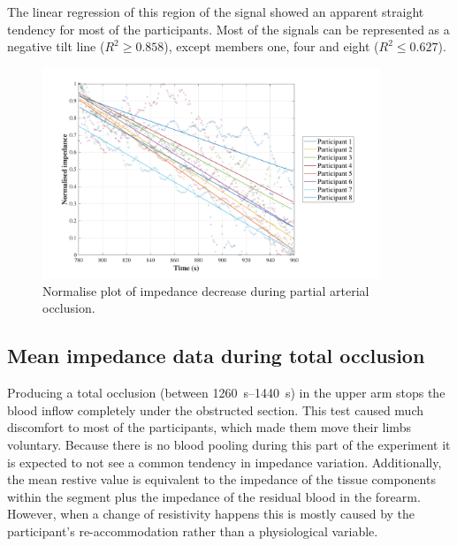 The linear regression of this region of the signal showed an apparent straight tendency for most of the participants. Most of the signals can be represented as a negative tilt line ($R^2 \geq 0.858 $), except members one, four and eight ($R^2 \leq 0.627 $).


\begin{figure}[!htbp]
	\centering
	\includegraphics[width=0.9\textwidth,height=0.9\textheight,keepaspectratio]{figure4}    
	\caption{Normalise plot of impedance decrease during partial arterial occlusion.}
	\label{fig:normalise:arterial_occlusion}
\end{figure}



\subsection{Mean impedance data during total occlusion}
\label{section results 2.4}
Producing a total occlusion (between \SIrange{1260}{1440}{\second}) in the upper arm stops the blood inflow completely under the obstructed section. This test caused much discomfort to most of the participants, which made them move their limbs voluntary. Because there is no blood pooling during this part of the experiment it is expected to not see a common tendency in impedance variation. Additionally, the mean restive value is equivalent to the impedance of the tissue components within the segment plus the impedance of the residual blood in the forearm. However, when a change of resistivity happens this is mostly caused by the participant's re-accommodation rather than a physiological variable. 

